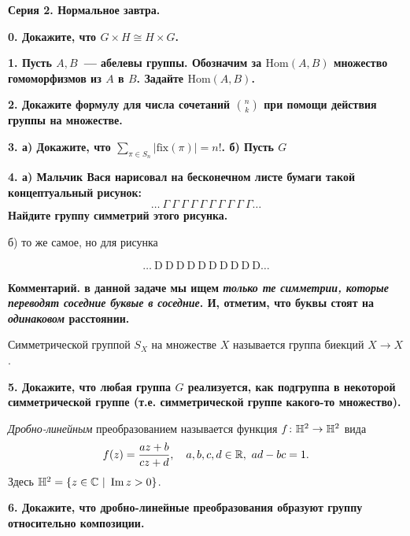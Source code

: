 \documentclass[12pt]{article}
\begin{document}
	\centerline{\bf{Серия 2. Нормальное завтра. }}

	\bf{0.} Докажите, что $G \times H \cong H \times G$.

	\bf{1.} Пусть $A, B$~--- абелевы группы. Обозначим за $\mathrm{Hom}(A, B)$ множество гомоморфизмов из $A$ в $B$. Задайте $\mathrm{Hom}(A, B)$. 

	\bf{2.} Докажите формулу для числа сочетаний $\binom{n}{k}$ при помощи действия группы на множестве. 

	\bf{3.} а) Докажите, что $\sum_{\pi \in S_n} |\mathrm{fix}(\pi)| = n!$. б) Пусть $G$ 


	\bf{4.} а) Мальчик Вася нарисовал на бесконечном листе бумаги такой концептуальный рисунок: 
	\[
		\ldots \ \Gamma \ \Gamma \ \Gamma \ \Gamma \ \Gamma \ \Gamma \ \Gamma \ \Gamma \ \Gamma \ \Gamma \ldots
	\]
	Найдите группу симметрий этого рисунка. 

	б) то же самое, но для рисунка 

	\[
		\ldots \ \mathrm{D} \ \mathrm{D} \ \mathrm{D} \ \mathrm{D} \ \mathrm{D}\ \mathrm{D} \ \mathrm{D} \ \mathrm{D} \ \mathrm{D} \ \mathrm{D}\ldots
	\]

	\noindent\bf{Комментарий.} в данной задаче мы ищем \emph{только те симметрии, которые переводят соседние буквые в соседние}. И, отметим, что буквы стоят на \emph{одинаковом} расстоянии. 

	\begin{definition} 
		Симметрической группой $S_{X}$ на множестве $X$ называется группа биекций $X \to X$.
	\end{definition}

	\bf{5.} Докажите, что любая группа $G$ реализуется, как подгруппа в некоторой симметрической группе (т.е. симметрической группе какого-то множество). 

	\begin{definition} 
		\emph{Дробно-линейным} преобразованием называется функция $f\colon \mathbb{H}^2 \to \mathbb{H}^2$ вида 
		\[
			f(z) = \frac{az + b}{cz + d}, \quad a, b, c, d \in \mathbb{R},\  ad - bc = 1.
		\]
		Здесь $\mathbb{H}^2 = \{ z \in \mathbb{C} \ \vert \ \mathop{\mathrm{Im}}\nolimits{z} > 0 \}$. 
	\end{definition}

	\bf{6.} Докажите, что дробно-линейные преобразования образуют группу относительно композиции.

	
\end{document}
